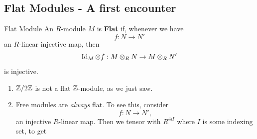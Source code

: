 \documentclass{article}
\begin{document}
\subsection{Flat Modules - A first encounter}
\begin{fancydefine}{Flat Module}
    An $R$-module $M$ is \textbf{Flat} if, whenever we have \[ f: N \to N' \] an $R$-linear injective map, then \[ \operatorname{Id}_{M} \otimes f : M \otimes_{R} N \to M \otimes_{R} N'\] is injective.
\end{fancydefine}
\begin{exs}\hspace{0.1cm}
    \begin{enumerate}
        \item $\mathbb{Z} / 2\mathbb{Z}$ is not a flat $\mathbb{Z}$-module, as we just saw.
        \item Free modules are \textit{always} flat. To see this, consider \[f : N \to N',\] an injective $R$-linear map. Then we tensor with $R^{\oplus I}$ where $I$ is some indexing set, to get \begin{center}
\end{center}
\end{enumerate}
\end{exs}
\end{document}
